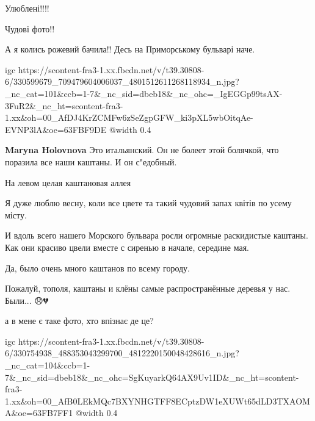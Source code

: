  
 
 
 
 

\qqSecCmt


Улюблені!!!!


Чудові фото!!


А я колись рожевий бачила!! Десь на Приморському бульварі наче.

\ifcmt
  igc https://scontent-fra3-1.xx.fbcdn.net/v/t39.30808-6/330599679_709479604006037_4801512611268118934_n.jpg?_nc_cat=101&ccb=1-7&_nc_sid=dbeb18&_nc_ohc=_IgEGGp99tsAX-3FuR2&_nc_ht=scontent-fra3-1.xx&oh=00_AfDJ4KrZCMFw6zSeZgpGFW_ki3pXL5wbOitqAe-EVNP3lA&oe=63FBF9DE
	@width 0.4
\fi

\begin{itemize} %
\textbf{Maryna Holovnova} Это итальянский. Он не болеет этой болячкой, что поразила все наши каштаны. И он с"едобный.
\end{itemize} %


На левом целая каштановая аллея🥰🥰🥰🥺🥺🥺🥺


Я дуже люблю весну, коли все цвете та такий чудовий запах квітів по усему
місту.


И вдоль всего нашего Морского бульвара росли огромные раскидистые каштаны. Как
они красиво цвели вместе с сиренью в начале, середине мая.

Да, было очень много каштанов по всему городу.

Пожалуй, тополя, каштаны и клёны самые распространённые деревья у нас. Были...
😞💔


а в мене є таке фото, хто впізнає де це?

\ifcmt
  igc https://scontent-fra3-1.xx.fbcdn.net/v/t39.30808-6/330754938_488353043299700_4812220150048428616_n.jpg?_nc_cat=104&ccb=1-7&_nc_sid=dbeb18&_nc_ohc=SgKuyarkQ64AX9Uv1ID&_nc_ht=scontent-fra3-1.xx&oh=00_AfB0LEkMQc7BXYNHGTFF8ECptzDW1eXUWt65dLD3TXAOMA&oe=63FB7FF1
	@width 0.4
\fi

